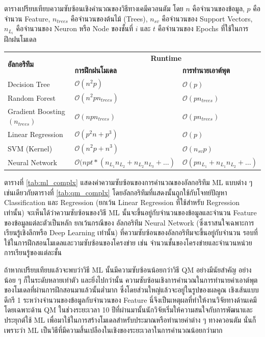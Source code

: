 \begin{adjustwidth}{-2.5 cm}{-2.5 cm}
    \centering
    \begin{threeparttable}[htbp]
    \caption{ตารางเปรียบเทียบความซับซ้อนเชิงคำนวณของวิธีทางเคมีควอนตัม\autocite{zotero-328} โดย $n$ คือจำนวนของข้อมูล, $p$ 
    คือจำนวน Feature, $n_{trees}$ คือจำนวนของต้นไม้ (Trees), $n_{sv}$ คือจำนวนของ Support Vectors, $n_{L_{i}}$ 
    คือจำนวนของ Neuron หรือ Node ของชั้นที่ $i$ และ $t$ คือจำนวนของ Epochs ที่ใช้ในการฝึกฝนโมเดล}
    \label{tab:ml_complx}
    \small
    \begin{tabular}{lll}\toprule
    \multirow{2}{*}{\textbf{อัลกอริทึม}} &\multicolumn{2}{c}{\textbf{Runtime}} \\\cmidrule{2-3}
    &\textbf{การฝึกฝนโมเดล} &\textbf{การทำนายเอาต์พุต}\\\midrule
    Decision Tree &$\mathcal{O}(n^{2}p)$ &$\mathcal{O}(p)$ \\
    Random Forest &$\mathcal{O}(n^{2}pn_{trees})$ &$\mathcal{O}(pn_{trees})$ \\
    Gradient Boosting $(n_{trees})$ &$\mathcal{O}(npn_{trees})$ &$\mathcal{O}(pn_{trees})$ \\
    Linear Regression &$\mathcal{O}(p^{2}n+p^{3})$ &$\mathcal{O}(p)$ \\
    SVM (Kernel) &$\mathcal{O}(n^{2}p+n^{3})$ &$\mathcal{O}(n_{sv}p)$ \\
    Neural Network &$\mathcal{O}(npt*(n_{L_{1}}n_{L_{2}}+ n_{L_{2}}n_{L_{3}} + \dots)$ &$\mathcal{O}(pn_{L_{1}} 
    + n_{L_{1}}n_{L_{2}}+ \dots)$ \\
    \bottomrule
    \end{tabular}
\end{threeparttable}
\end{adjustwidth}

ตารางที่ \ref{tab:ml_complx} แสดงค่าความซับซ้อนของการคำนวณของอัลกอริทึม ML แบบต่าง ๆ เช่นเดียวกับตารางที่ \ref{tab:qm_complx} 
โดยอัลกอริทึมที่แสดงนั้นถูกใช้กับโจทย์ปัญหา Classification และ Regression (ยกเว้น Linear Regression ที่ใช้สำหรับ Regression 
เท่านั้น) จะเห็นได้ว่าความซับซ้อนของวิธี ML นั้นจะขึ้นอยู่กับจำนวนของข้อมูลและจำนวน Feature ของข้อมูลแต่ละตัวเป็นหลัก ยกเว้นกรณีของ%
อัลกอริทึม Neural Network (ซึ่งเราสนใจเฉพาะการเรียนรู้เชิงลึกหรือ Deep Learning เท่านั้น) ที่ความซับซ้อนของอัลกอริทึมจะขึ้นอยู่กับจำนวน%
รอบที่ใช้ในการฝึกสอนโมเดลและวามซับซ้อนของโครงข่าย เช่น จำนวนชั้นของโครงข่ายและจำนวนหน่วยการเรียนรู้ของแต่ละชั้น

ถ้าหากเปรียบเทียบแล้วจะพบว่าวิธี ML นั้นมีความซับซ้อนน้อยกว่าวิธี QM อย่างมีนัยสำคัญ อย่างน้อย ๆ ก็ในระดับหลายเท่าตัว และยิ่งไปกว่านั้น
ความซับซ้อนเชิงการคำนวณในการทำนายค่าเอาต์พุตของโมเดลที่ผ่านการฝึกสอนมาแล้วนั้นต่ำมาก ซึ่งโดยส่วนใหญ่แล้วจะอยู่ในรูปของผลคูณ%
เชิงเส้นแบบดีกรี 1 ระหว่างจำนวนของข้อมูลกับจำนวนของ Feature นี่จึงเป็นเหตุผลที่ทำให้งานวิจัยทางด้านเคมีโดยเฉพาะด้าน QM ในช่วงระยะเวลา
10 ปีที่ผ่านมานั้นนักวิจัยเริ่มให้ความสนใจกับการพัฒนาและประยุกต์ใช้ ML เพื่อมาใช้ในการสร้างโมเดลสำหรับประมาณหรือทำนายค่าต่าง ๆ ทางควอนตัม%
นั่นก็เพราะว่า ML เป็นวิธีที่มีความสิ้นเปลืองในเชิงของระยะเวลาในการคำนวณน้อยกว่ามาก%
\autocite{baum2021,mowbray2022,rodriguez-perez2022}

